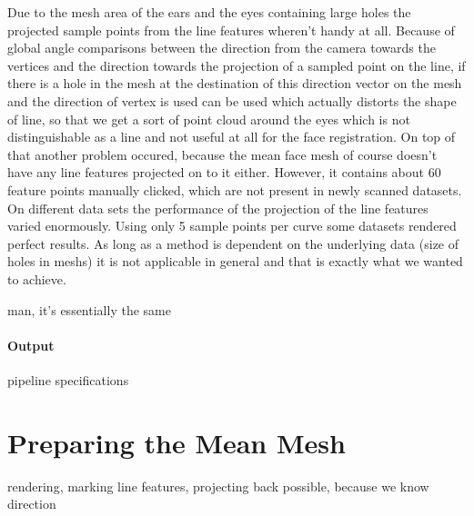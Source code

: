 Due to the mesh area of the ears and the eyes containing large holes the projected sample points from the line features wheren't handy at all. Because of global angle comparisons between the direction from the camera towards the vertices and the direction towards the projection of a sampled point on the line, if there is a hole in the mesh at the destination of this direction vector on the mesh and the direction of vertex is used can be used which actually distorts the shape of line,
so that we get a sort of point cloud around the eyes which is not distinguishable as a line and not useful at all for the face registration. On top of that another problem occured, because the mean face mesh of course doesn't have any line features projected on to it either. However, it contains about 60 feature points manually clicked, which are not present in newly scanned datasets. 
On different data sets the performance of the projection of the line features varied enormously. Using only 5 sample points per curve some datasets rendered perfect results. As long as a method is dependent on the underlying data (size of holes in meshs) it is not applicable in general and that is exactly what we wanted to achieve.

man, it's essentially the same

\paragraph{Output}
pipeline specifications

\section{Preparing the Mean Mesh}
rendering, marking line features, projecting back possible, because we know direction


